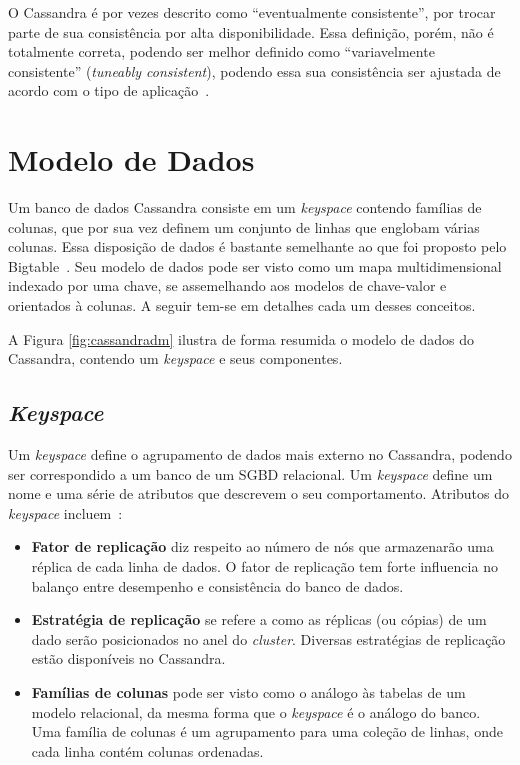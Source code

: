 O Cassandra é por vezes descrito como \enquote{eventualmente consistente}, por trocar parte de sua consistência por alta disponibilidade. Essa definição, porém, não é totalmente correta, podendo ser melhor definido como \enquote{variavelmente consistente} (\emph{tuneably consistent}), podendo essa sua consistência ser ajustada de acordo com o tipo de aplicação~\cite{cassandraguide}.

\section{Modelo de Dados}

Um banco de dados Cassandra consiste em um \emph{keyspace} contendo famílias de colunas, que por sua vez definem um conjunto de linhas que englobam várias colunas. Essa disposição de dados é bastante semelhante ao que foi proposto pelo Bigtable~\cite{lakshmancassandra, bigtable}. Seu modelo de dados pode ser visto como um mapa multidimensional indexado por uma chave, se assemelhando aos modelos de chave-valor e orientados à colunas. A seguir tem-se em detalhes cada um desses conceitos.

A Figura \ref{fig:cassandradm} ilustra de forma resumida o modelo de dados do Cassandra, contendo um \emph{keyspace} e seus componentes. 


\subsection*{\emph{Keyspace}}
Um \emph{keyspace} define o agrupamento de dados mais externo no Cassandra, podendo ser correspondido a um banco de um SGBD relacional. Um \emph{keyspace} define um nome e uma série de atributos que descrevem o seu comportamento. 
Atributos do \emph{keyspace} incluem~\cite{cassandraguide}:
\begin{itemize}
\item \textbf{Fator de replicação} diz respeito ao número de nós que armazenarão uma réplica de cada linha de dados. O fator de replicação tem forte influencia no balanço entre desempenho e consistência do banco de dados.
\item \textbf{Estratégia de replicação} se refere a como as réplicas (ou cópias) de um dado serão posicionados no anel do \emph{cluster}. Diversas estratégias de replicação estão disponíveis no Cassandra.
\item \textbf{Famílias de colunas} pode ser visto como o análogo às tabelas de um modelo relacional, da mesma forma que o \emph{keyspace} é o análogo do banco.  Uma família de colunas é um agrupamento para uma coleção de linhas, onde cada linha contém colunas ordenadas.
\end{itemize}



